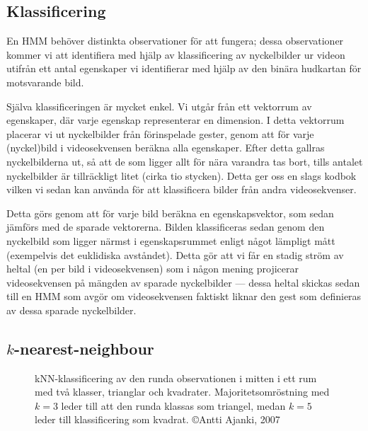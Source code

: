 \documentclass[../rapport_MVEX01-11-05]{subfiles}
\begin{document}
\subsection{Klassificering}
En HMM behöver distinkta observationer för att fungera; dessa
observationer kommer vi att identifiera med hjälp av klassificering av
nyckelbilder ur videon utifrån ett antal egenskaper vi identifierar
med hjälp av den binära hudkartan för motsvarande bild.

Själva klassificeringen är mycket enkel. Vi utgår från ett vektorrum
av egenskaper, där varje egenskap representerar en dimension. I detta
vektorrum placerar vi ut nyckelbilder från förinspelade gester, genom
att för varje (nyckel)bild i videosekvensen beräkna alla egenskaper.
Efter detta gallras nyckelbilderna ut, så att de som ligger allt för
nära varandra tas bort, tills antalet nyckelbilder är tillräckligt
litet (cirka tio stycken).
Detta ger oss en slags kodbok vilken vi sedan kan använda för att
klassificera bilder från andra videosekvenser. 


Detta görs genom att för varje bild beräkna en egenskapsvektor, som
sedan jämförs med de sparade vektorerna. Bilden klassificeras sedan
genom den nyckelbild som ligger närmst i egenskapsrummet enligt något
lämpligt mått (exempelvis det euklidiska avståndet). Detta gör att vi
får en stadig ström av heltal (en per bild i videosekvensen) som i
någon mening projicerar videosekvensen på mängden av sparade
nyckelbilder --- dessa heltal skickas sedan till en HMM som avgör om
videosekvensen faktiskt liknar den gest som definieras av dessa
sparade nyckelbilder.

\subsection{$k$-nearest-neighbour}

%

\begin{figure}[!htpb]
    \begin{center}
    \end{center}
    \caption{kNN-klassificering av den runda observationen i mitten i ett rum
    med två klasser, trianglar och kvadrater. Majoritetsomröstning
    med $k=3$ leder till att den runda klassas som triangel, medan $k=5$ leder
    till klassificering som kvadrat. \copyright Antti Ajanki, 2007}
    \label{fig:knn-overview}
\end{figure}


\end{document}
